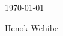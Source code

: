 \documentclass[10pt,A4,english]{article}
\begin{document}
\begin{paracol}{2}
\begin{rightcolumn}
\today     \hspace{1cm}   \hrulefill

\hspace*{30mm}\phantom{Henok, \today }Henok Wehibe

\end{rightcolumn}
\end{paracol}
\end{document}
